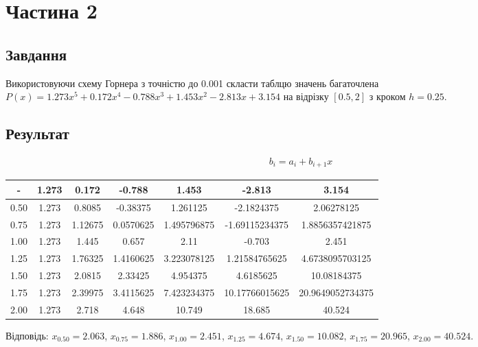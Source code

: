 \section{Частина 2}
\label{sec:task2}

\subsection{Завдання}
\label{subsec:task2_task}

Використовуючи схему Горнера з точністю до 0.001 скласти таблцю значень
багаточлена $P(x) = 1.273x^5 + 0.172x^4 - 0.788x^3 + 1.453x^2 - 2.813x + 3.154$
на відрізку $[0.5, 2]$ з кроком $h = 0.25$.

\subsection{Результат}
\label{subsec:task2_result}

\begin{align}
    b_i = a_i + b_{i + 1} x
\end{align}

\begin{tabular}{|c|c|c|c|c|c|c|}
    \toprule
    -    & 1.273 & 0.172   & -0.788    & 1.453       & -2.813         & 3.154            \\

    \midrule
    0.50 & 1.273 & 0.8085  & -0.38375  & 1.261125    & -2.1824375     & 2.06278125       \\
    \hline
    0.75 & 1.273 & 1.12675 & 0.0570625 & 1.495796875 & -1.69115234375 & 1.8856357421875  \\
    \hline
    1.00 & 1.273 & 1.445   & 0.657     & 2.11        & -0.703         & 2.451            \\
    \hline
    1.25 & 1.273 & 1.76325 & 1.4160625 & 3.223078125 & 1.21584765625  & 4.6738095703125  \\
    \hline
    1.50 & 1.273 & 2.0815  & 2.33425   & 4.954375    & 4.6185625      & 10.08184375      \\
    \hline
    1.75 & 1.273 & 2.39975 & 3.4115625 & 7.423234375 & 10.17766015625 & 20.9649052734375 \\
    \hline
    2.00 & 1.273 & 2.718   & 4.648     & 10.749      & 18.685         & 40.524           \\

    \bottomrule
\end{tabular}

Відповідь:
$x_{0.50} =  2.063$,
$x_{0.75} =  1.886$,
$x_{1.00} =  2.451$,
$x_{1.25} =  4.674$,
$x_{1.50} = 10.082$,
$x_{1.75} = 20.965$,
$x_{2.00} = 40.524$.
